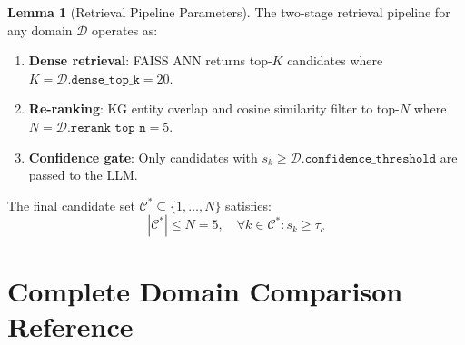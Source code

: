\documentclass[12pt,a4paper]{article}
\theoremstyle{definition}
\newtheorem{lemma}[theorem]{Lemma}
\theoremstyle{remark}
\begin{document}
\begin{lemma}[Retrieval Pipeline Parameters]
The two-stage retrieval pipeline for any domain $\mathcal{D}$ operates as:
\begin{enumerate}
  \item \textbf{Dense retrieval}: FAISS ANN returns top-$K$ candidates
        where $K = \mathcal{D}.\texttt{dense\_top\_k} = 20$.
  \item \textbf{Re-ranking}: KG entity overlap and cosine similarity
        filter to top-$N$ where $N = \mathcal{D}.\texttt{rerank\_top\_n} = 5$.
  \item \textbf{Confidence gate}: Only candidates with
        $s_k \geq \mathcal{D}.\texttt{confidence\_threshold}$ are passed
        to the LLM.
\end{enumerate}
The final candidate set $\mathcal{C}^* \subseteq \{1,\ldots,N\}$ satisfies:
\[
  |\mathcal{C}^*| \leq N = 5, \quad
  \forall k \in \mathcal{C}^*: s_k \geq \tau_c
\]
\end{lemma}

\section{Complete Domain Comparison Reference}
\end{document}
